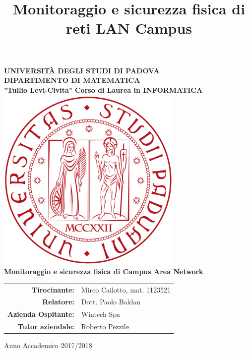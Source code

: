 \documentclass[openany, a4paper, 12pt]{report}
\title{Monitoraggio e sicurezza fisica di reti LAN Campus}
\begin{document}
\begin{titlepage}
	\centering
	\vfill
	{
		\bfseries
		\Large{UNIVERSITÀ DEGLI STUDI DI PADOVA}\\
		\large DIPARTIMENTO DI MATEMATICA\\
		 "Tullio Levi-Civita"
		\noindent\makebox[\linewidth]{\rule{16cm}{0.4pt}}
		Corso di Laurea in INFORMATICA
		\vskip1cm
		\includegraphics[width=9cm]{images/LogoPadova} \\
		\vfill
		\LARGE Monitoraggio e sicurezza fisica di Campus Area Network
		\vfill

		\begin{table}[htbp]
			\centering
			\renewcommand\arraystretch{1.2}
			\begin{tabular}{r|l}
				\textbf{Tirocinante:} & Mirco Cailotto, mat. 1123521 \\
				\textbf{Relatore:} & Dott. Paolo Baldan \\
				\textbf{Azienda Ospitante:}	& Wintech Spa \\
				\textbf{Tutor aziendale:} & Roberto Pezzile \\
			\end{tabular}
		\end{table}
		
		\vfill
		\noindent\makebox[\linewidth]{\rule{16cm}{0.4pt}}
		\large Anno Accademico 2017/2018
		\vfill
	}    
\end{titlepage}
\clearpage\thispagestyle{empty}\mbox{}\clearpage

\clearpage\thispagestyle{empty}\mbox{}\clearpage
{}
\tableofcontents
\listoffigures
\listoftables

\newpage
\clearpage\thispagestyle{empty}\mbox{}\clearpage
{}

\clearpage\thispagestyle{empty}\mbox{}\clearpage
{}





\clearpage\thispagestyle{empty}\mbox{}\clearpage
\end{document}
